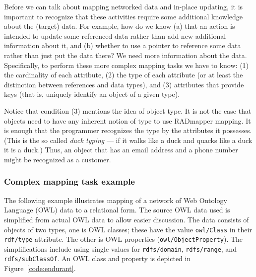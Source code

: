 \documentclass[9pt,letterpaper]{article}
\newcommand{\stt}[1]{\texttt{#1}}
\begin{document}
Before we can talk about mapping networked data and in-place updating, it is important to recognize that these activities require
some additional knowledge about the (target) data.
For example, how do we know
(a) that an action is intended to update some referenced data rather than add new additional information about it, and
(b) whether to use a pointer to reference some data rather than just put the data there?
We need more information about the data.
Specifically, to perform these more complex mapping tasks we have to know:
(1) the cardinality of each attribute,
(2) the type of each attribute (or at least the distinction between references and data types), and
(3) attributes that provide keys (that is, uniquely identify an object of a given type).

Notice that condition (3) mentions the idea of object type.
It is not the case that objects need to have any inherent notion of type to use RADmapper mapping.
It is enough that the programmer recognizes the type by the attributes it possesses.
(This is the so called \textit{duck typing} --- if it walks like a duck and quacks like a duck it is a duck.)
Thus, an object that has an email address and a phone number might be recognized as a customer.

\subsubsection{Complex mapping task example}

The following example illustrates mapping of a network of Web Ontology Language (OWL) data to a relational form.
The source OWL data used is simplified from actual OWL data to allow easier discussion.
The data consists of objects of two types, one is OWL classes; these have the value  \stt{owl/Class} in their \stt{rdf/type} attribute.
The other is OWL properties (\stt{owl/ObjectProperty}).
The simplifications include using single values for \stt{rdfs/domain}, \stt{rdfs/range}, and \stt{rdfs/subClassOf}.
An OWL class and property is depicted in Figure~\ref{code:endurant}.
\end{document}
